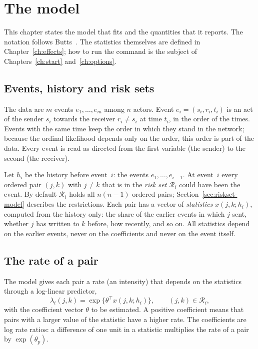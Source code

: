 \chapter{The model}\label{ch:model}

This chapter states the model that \nwrem{} fits and the quantities that it reports. The notation follows Butts~\cite{butts2008}. The statistics themselves are defined in Chapter~\ref{ch:effects}; how to run the command is the subject of Chapters~\ref{ch:start} and~\ref{ch:options}.

\section{Events, history and risk sets}

The data are $m$ events $e_1,\dots,e_m$ among $n$ actors. Event $e_i=(s_i,r_i,t_i)$ is an act of the sender $s_i$ towards the receiver $r_i\neq s_i$ at time $t_i$, in the order of the times. Events with the same time keep the order in which they stand in the network; because the ordinal likelihood depends only on the order, this order is part of the data. Every event is read as directed from the first variable (the sender) to the second (the receiver).

Let $h_i$ be the history before event~$i$: the events $e_1,\dots,e_{i-1}$. At event~$i$ every ordered pair $(j,k)$ with $j\neq k$ that is in the \emph{risk set} $\mathcal R_i$ could have been the event. By default $\mathcal R_i$ holds all $n(n-1)$ ordered pairs; Section~\ref{sec:riskset-model} describes the restrictions. Each pair has a vector of \emph{statistics} $x(j,k;h_i)$, computed from the history only: the share of the earlier events in which $j$ sent, whether $j$ has written to $k$ before, how recently, and so on. All statistics depend on the earlier events, never on the coefficients and never on the event itself.

\section{The rate of a pair}

The model gives each pair a rate (an intensity) that depends on the statistics through a log-linear predictor,
\begin{equation}\label{eq:rate}
\lambda_i(j,k)=\exp\{\theta^{\top}x(j,k;h_i)\},\qquad (j,k)\in\mathcal R_i ,
\end{equation}
with the coefficient vector $\theta$ to be estimated. A positive coefficient means that pairs with a larger value of the statistic have a higher rate. The coefficients are log rate ratios: a difference of one unit in a statistic multiplies the rate of a pair by $\exp(\theta_p)$.

